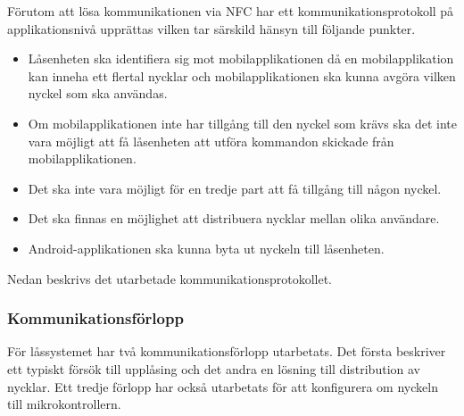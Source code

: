 \documentclass[11pt]{article}
\begin{document}
Förutom att lösa kommunikationen via NFC har ett kommunikationsprotokoll på applikationsnivå upprättas vilken tar särskild hänsyn till följande punkter.

\begin{itemize}
\item Låsenheten ska identifiera sig mot mobilapplikationen då en mobilapplikation kan inneha ett flertal nycklar och mobilapplikationen ska kunna avgöra vilken nyckel som ska användas.
\item Om mobilapplikationen inte har tillgång till den nyckel som krävs ska det inte vara möjligt att få låsenheten att utföra kommandon skickade från mobilapplikationen.
\item Det ska inte vara möjligt för en tredje part att få tillgång till någon nyckel.
\item Det ska finnas en möjlighet att distribuera nycklar mellan olika användare.
\item Android-applikationen ska kunna byta ut nyckeln till låsenheten.
\end{itemize}

Nedan beskrivs det utarbetade kommunikationsprotokollet.

\subsubsection{Kommunikationsförlopp}
För låssystemet har två kommunikationsförlopp utarbetats. Det första beskriver ett typiskt försök till upplåsing och det andra en lösning till distribution av nycklar. Ett tredje förlopp har också utarbetats för att konfigurera om nyckeln till mikrokontrollern.
\end{document}
